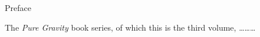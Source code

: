 \newpage           %
\thispagestyle{empty}      %
\mbox{}                    %
\newpage                   %



\begin{center}
{\lgb Preface}
\end{center}

The {\it Pure Gravity} book series, of which this is the third volume,
\dots\dots\dots


\tableofcontents

\listoffigures

